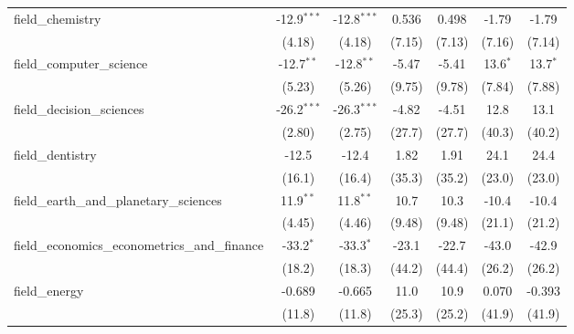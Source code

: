 \begin{tabular}{lcccccc}
   field\_chemistry                                            & -12.9$^{***}$  & -12.8$^{***}$ & 0.536          & 0.498          & -1.79         & -1.79\\   
                                                               & (4.18)         & (4.18)        & (7.15)         & (7.13)         & (7.16)        & (7.14)\\   
   field\_computer\_science                                    & -12.7$^{**}$   & -12.8$^{**}$  & -5.47          & -5.41          & 13.6$^{*}$    & 13.7$^{*}$\\   
                                                               & (5.23)         & (5.26)        & (9.75)         & (9.78)         & (7.84)        & (7.88)\\   
   field\_decision\_sciences                                   & -26.2$^{***}$  & -26.3$^{***}$ & -4.82          & -4.51          & 12.8          & 13.1\\   
                                                               & (2.80)         & (2.75)        & (27.7)         & (27.7)         & (40.3)        & (40.2)\\   
   field\_dentistry                                            & -12.5          & -12.4         & 1.82           & 1.91           & 24.1          & 24.4\\   
                                                               & (16.1)         & (16.4)        & (35.3)         & (35.2)         & (23.0)        & (23.0)\\   
   field\_earth\_and\_planetary\_sciences                      & 11.9$^{**}$    & 11.8$^{**}$   & 10.7           & 10.3           & -10.4         & -10.4\\   
                                                               & (4.45)         & (4.46)        & (9.48)         & (9.48)         & (21.1)        & (21.2)\\   
   field\_economics\_econometrics\_and\_finance                & -33.2$^{*}$    & -33.3$^{*}$   & -23.1          & -22.7          & -43.0         & -42.9\\   
                                                               & (18.2)         & (18.3)        & (44.2)         & (44.4)         & (26.2)        & (26.2)\\   
   field\_energy                                               & -0.689         & -0.665        & 11.0           & 10.9           & 0.070         & -0.393\\   
                                                               & (11.8)         & (11.8)        & (25.3)         & (25.2)         & (41.9)        & (41.9)\\   

\end{tabular}
